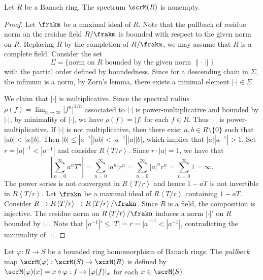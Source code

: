 \begin{theorem}\label{thm:norm_spectrum_of_Banach_rings_is_nonempty}
	Let \(R\) be a Banach ring.
	The spectrum \(\scrM(R)\) is nonempty.
\end{theorem}
\begin{proof}
	Let \(\frakm\) be a maximal ideal of \(R\).
	Note that the pullback of residue norm on the residue field \(R/\frakm\) is bounded with respect to the given norm on \(R\).
	Replacing \(R\) by the completion of \(R/\frakm\), we may assume that \(R\) is a complete field.
	Consider the set
	\[ \Sigma = \{ \text{norm on } R \text{ bounded by the given norm } \|\cdot\| \} \]
	with the partial order defined by boundedness.
	Since for a descending chain in \(\Sigma\), the infimum is a norm, by Zorn's lemma, there exists a minimal element \(|\cdot| \in \Sigma\).

	We claim that \(|\cdot|\) is multiplicative.
	Since the spectral radius \(\rho(f) = \lim_{n \to \infty} |f^n|^{1/n}\) associated to \(|\cdot|\) is power-multiplicative and bounded by \(|\cdot|\), by minimality of \(|\cdot|\), we have \(\rho(f) = |f|\) for each \(f \in R\).
	Thus \(|\cdot|\) is power-multiplicative.
	If \(|\cdot|\) is not multiplicative, then there exist \(a,b \in R\setminus \{0\}\) such that \(|ab|<|a||b|\).
	Then \(|b| \leq |a^{-1}| |ab| < |a^{-1}| |a| |b|\), which implies that \(|a| |a^{-1}| > 1\).
	Set \(r = |a|^{-1} < |a^{-1}|\) and consider \(R\left<T/r\right>\).
	Since \(r \cdot |a| = 1\), we have that
	\[ \left|\sum_{n=0}^\infty a^n T^n\right| = \sum_{n=0}^\infty |a^n| r^n = \sum_{n=0}^\infty |a|^n r^n = \sum_{n=0}^\infty 1 = \infty. \]
	The power series is not convergent in \(R\left<T/r\right>\) and hence \(1 - aT\) is not invertible in \(R\left<T/r\right>\).
	Let \(\frakn\) be a maximal ideal of \(R\left<T/r\right>\) containing \(1 - aT\).
	Consider \( R \to R\left<T/r\right> \to R\left<T/r\right>/\frakn \).
	Since \(R\) is a field, the composition is injective.
	The residue norm on \(R\left<T/r\right>/\frakn\) induces a norm \(|\cdot|'\) on \(R\) bounded by \(|\cdot|\).
	Note that \(|a^{-1}|' \leq |T| = r = |a|^{-1} < |a^{-1}|\), contradicting the minimality of \(|\cdot|\).
\end{proof}

\begin{definition}\label{def:pullback_of_ring_homomorphism_of_banach_rings_on_spectrum}
	Let \(\varphi: R \to S\) be a bounded ring homomorphism of Banach rings.
	The \emph{pullback} map \(\scrM(\varphi): \scrM(S) \to \scrM(R)\) is defined by \(\scrM(\varphi)(x) = x \circ \varphi: f \mapsto |\varphi(f)|_x\) for each \(x \in \scrM(S)\).
\end{definition}

